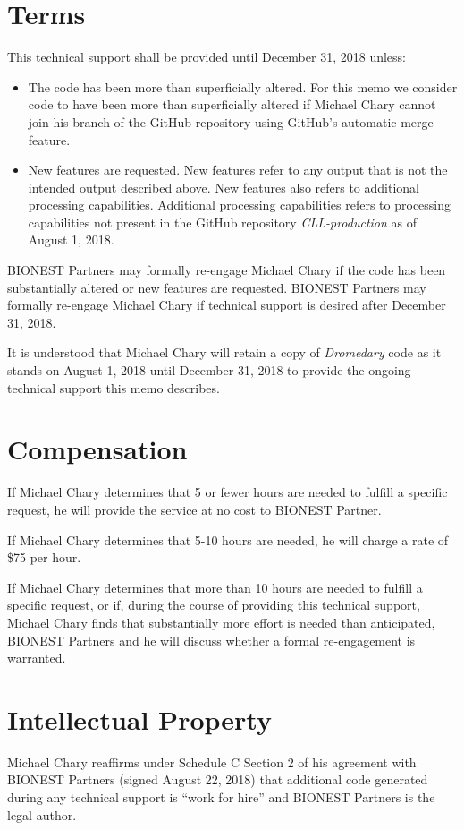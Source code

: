 \documentclass[a4paper,11pt]{texMemo}
\begin{document}
\section*{Terms}
  This technical support shall be provided until December 31, 2018 unless:
  \begin{itemize}
  	\item The code has been more than superficially altered. For this memo we consider code to have been more than superficially altered if Michael Chary cannot join his branch of the GitHub repository using GitHub's automatic merge feature. 
    \item New features are requested. New features refer to any output that is not the intended output described above. New features also refers to additional processing capabilities. Additional processing capabilities refers to processing capabilities not present in the GitHub repository \emph{CLL-production} as of August 1, 2018. 
  \end{itemize}
  
  BIONEST Partners may formally re-engage Michael Chary if the code has been substantially altered or new features are requested. BIONEST Partners may formally re-engage Michael Chary if technical support is desired after December 31, 2018. 

 It is understood that Michael Chary will retain a copy of \emph{Dromedary} code as it stands on August 1, 2018 until December 31, 2018 to provide the ongoing technical support this memo describes. 

\section*{Compensation}
	If Michael Chary determines that 5 or fewer hours are needed to fulfill a specific request, he will provide the service at no cost to BIONEST Partner. 
    
    If Michael Chary determines that 5-10 hours are needed, he will charge a rate of \$75 per hour. 
    
    If Michael Chary determines that more than 10 hours are needed to fulfill a specific request, or if, during the course of providing this technical support, Michael Chary finds that substantially more effort is needed than anticipated, BIONEST Partners and he will discuss whether a formal re-engagement is warranted. 
    
\section*{Intellectual Property}
   Michael Chary reaffirms under Schedule C Section 2 of his agreement with BIONEST Partners (signed August 22, 2018) that additional code generated during any technical support is ``work for hire'' and BIONEST Partners is the legal author. 
   
\end{document}
